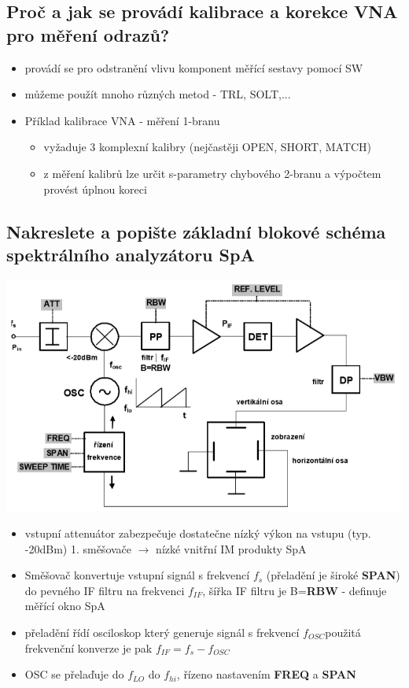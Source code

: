 \documentclass[a4paper]{article}
\begin{document}
\subsection{\textbf{Proč a jak se provádí kalibrace a korekce VNA pro měření odrazů?}}
\begin{itemize}
	\item provádí se pro odstranění vlivu komponent měřící sestavy pomocí SW
	\item můžeme použít mnoho různých metod - TRL, SOLT,...
	\item Příklad kalibrace VNA - měření 1-branu
	\begin{itemize}
		\item vyžaduje 3 komplexní kalibry (nejčastěji OPEN, SHORT, MATCH)
		\item z měření kalibrů lze určit s-parametry chybového 2-branu a výpočtem provést úplnou koreci
	\end{itemize}
\end{itemize}
\subsection{\textbf{Nakreslete a popište základní blokové schéma spektrálního analyzátoru SpA}}
\includegraphics[width=\textwidth,keepaspectratio]{images/SpA.png}
\begin{itemize}
	\item vstupní attenuátor zabezpečuje dostatečne nízký výkon na vstupu (typ. -20dBm) 1. směšovače $\to$ nízké vnitřní IM produkty SpA
	\item Směšovač konvertuje vstupní signál s frekvencí $f_s$ (přeladění je široké \textbf{SPAN}) do pevného IF filtru na frekvenci $f_{IF}$, šířka IF filtru je B=\textbf{RBW} - definuje měřící okno SpA
	\item přeladění řídí osciloskop který generuje signál s frekvencí $f_{OSC}$použitá frekvenční konverze je pak $f_{IF} = f_s-f_{OSC}$
	\item OSC se přelaďuje do $f_{LO}$ do $f_{hi}$, řízeno nastavením \textbf{FREQ} a \textbf{SPAN}
\end{itemize}
\end{document}
